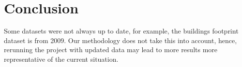 \chapter{Conclusion}



Some datasets were not always up to date, for example, the buildings footprint dataset is from 2009. Our methodology does not take this into account, hence, rerunning the project with updated data may lead to more results more representative of the current situation.
